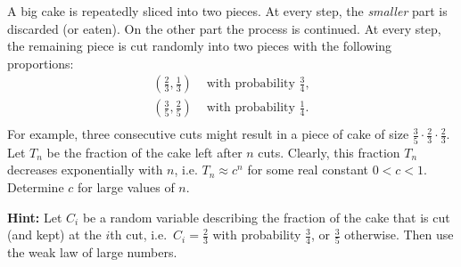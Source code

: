 \documentclass[a4paper,10pt,landscape,twocolumn]{scrartcl}
\begin{document}
\pagebreak

\begin{exercise}
A big cake is repeatedly sliced into two pieces. At every step, the \emph{smaller} part is discarded (or eaten). On the other part the process is continued. At every step, the remaining piece is cut randomly into two pieces with the following proportions:
\begin{align*}
\left(\frac{2}{3},\frac{1}{3}\right) &\mbox{ with probability } \frac{3}{4},\\
\left(\frac{3}{5},\frac{2}{5}\right) &\mbox{ with probability } \frac{1}{4}.\\
\end{align*}
For example, three consecutive cuts might result in a piece of cake of size $\frac{3}{5} \cdot \frac{2}{3} \cdot \frac{2}{3}$. Let $T_n$ be the fraction of the cake left after $n$ cuts. Clearly, this fraction $T_n$ decreases exponentially with $n$, i.e. $T_n \approx c^n$ for some real constant $0<c<1$. Determine $c$ for large values of $n$.

\textbf{Hint:} Let $C_i$ be a random variable describing the fraction of the cake that is cut (and kept) at the $i$th cut, i.e.\ $C_i = \frac{2}{3}$ with probability $\frac{3}{4}$, or $\frac{3}{5}$ otherwise.  Then use the weak law of large numbers.





\end{exercise}
\end{document}
